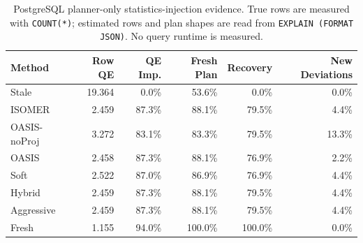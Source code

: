 \begin{table}[t]
  \centering
  \small
  \caption{PostgreSQL planner-only statistics-injection evidence. True rows are measured with \texttt{COUNT(*)}; estimated rows and plan shapes are read from \texttt{EXPLAIN (FORMAT JSON)}. No query runtime is measured.}
  \label{tab:postgres_planner_stats_injection}
  \setlength{\tabcolsep}{4pt}
  \begin{tabular}{lrrrrr}
    \toprule
    Method & Row QE & QE Imp. & Fresh Plan & Recovery & New Deviations \\
    \midrule
    Stale & 19.364 & 0.0\% & 53.6\% & 0.0\% & 0.0\% \\
    ISOMER & 2.459 & 87.3\% & 88.1\% & 79.5\% & 4.4\% \\
    OASIS-noProj & 3.272 & 83.1\% & 83.3\% & 79.5\% & 13.3\% \\
    OASIS & 2.458 & 87.3\% & 88.1\% & 76.9\% & 2.2\% \\
    Soft & 2.522 & 87.0\% & 86.9\% & 76.9\% & 4.4\% \\
    Hybrid & 2.459 & 87.3\% & 88.1\% & 79.5\% & 4.4\% \\
    Aggressive & 2.459 & 87.3\% & 88.1\% & 79.5\% & 4.4\% \\
    Fresh & 1.155 & 94.0\% & 100.0\% & 100.0\% & 0.0\% \\
    \bottomrule
  \end{tabular}
\end{table}
